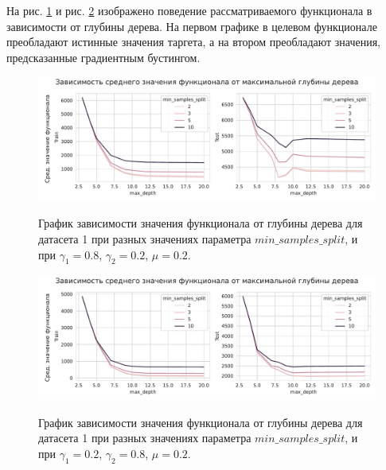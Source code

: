 \documentclass{article}
\begin{document}
На рис. \ref{ris:image4} и рис. \ref{ris:image5} изображено поведение рассматриваемого функционала в зависимости от глубины дерева. На первом графике в целевом функционале преобладают истинные значения таргета, а на втором преобладают значения, предсказанные градиентным бустингом. 


\begin{figure}[h]
	\begin{center}
		\begin{minipage}[h]{0.95\linewidth}
			{\includegraphics[width=1.0\linewidth]{../figures/max_depth_task1_gamma_08_mu_02.pdf}}	
		\end{minipage}
	\end{center}
	
	\caption{График зависимости значения функционала от глубины дерева для датасета 1 при разных значениях параметра $min\_samples\_split$, и при $\gamma_1 = 0.8$, $\gamma_2 = 0.2$, $\mu = 0.2$. }
	\label{ris:image4}
\end{figure}


\begin{figure}[h]
	\begin{center}
		\begin{minipage}[h]{0.95\linewidth}
			{\includegraphics[width=1.0\linewidth]{../figures/max_depth_task1_gamma_02_mu_02.pdf}}	
		\end{minipage}
	\end{center}
	
	\caption{График зависимости значения функционала от глубины дерева для датасета 1 при разных значениях параметра $min\_samples\_split$, и при $\gamma_1 = 0.2$, $\gamma_2 = 0.8$, $\mu = 0.2$. }
	\label{ris:image5}
\end{figure}
\end{document}
